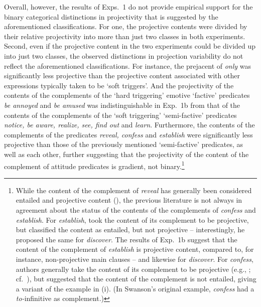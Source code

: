 \documentclass[11pt,fleqn]{article}
\newcommand{\6}{\mbox{$[\hspace*{-.6mm}[$}}
\newcommand{\9}{\mbox{$]\hspace*{-.6mm}]$}}
\begin{document}
Overall, however, the results of Exps.~1 do not provide empirical support for the binary categorical distinctions in projectivity that is suggested by the aforementioned classifications. For one, the projective contents were divided by their relative projectivity into more than just two classes in both experiments. Second, even if the projective content in the two experiments could be divided up into just two classes, the observed distinctions in projection variability do not reflect the aforementioned classifications. For instance, the prejacent of {\em only} was significantly less projective than the projective content associated with other expressions typically taken to be `soft triggers'. And the projectivity of the contents of the complements of the `hard triggering' emotive `factive' predicates {\em be annoyed} and {\em be amused} was indistinguishable in Exp.~1b from that of the contents of the complements of the `soft triggering' `semi-factive' predicates {\em notice, be aware, realize, see, find out} and {\em learn}. Furthermore, the contents of the complements of the predicates {\em reveal, confess} and {\em establish} were significantly less projective than those of the previously mentioned `semi-factive' predicates, as well as each other, further suggesting that the projectivity of the content of the complement of attitude predicates is gradient, not binary.\footnote{While the content of the complement of {\em reveal} has generally been considered entailed and projective content (\citealt{hooper1974,melvold1991}), the previous literature is not always in agreement about the status of the contents of the complements of {\em confess} and {\em establish}. For {\em establish}, \citet{wyse} took the content of its complement to be projective, but \citet{swanson2012} classified the content as entailed, but not projective -- interestingly, he proposed the same for {\em discover}. The results of Exp.~1b suggest that the content of the complement of {\em establish} is projective content, compared to, for instance, non-projective main clauses -- and likewise for {\em discover}. For {\em confess}, authors generally take the content of its complement to be projective (e.g., \citealt{reis1973,melvold1991,schultz2003,swanson2012,karttunen2016}; cf.\ \citealt{wyse}), but \citet{swanson2012} suggested that the content of the complement is not entailed, giving a variant of the example in (i). (In Swanson's original example, {\em confess} had a {\em to-}infinitive as complement.)

}
\end{document}
